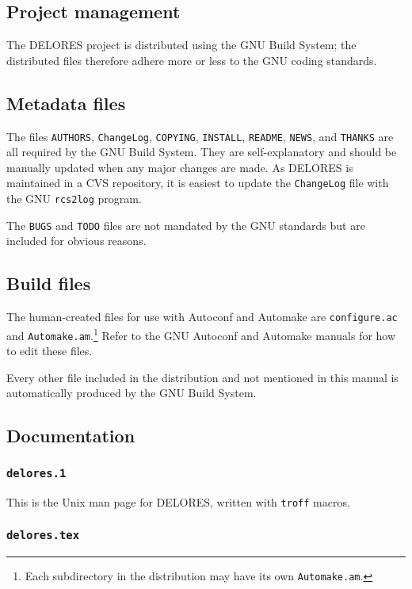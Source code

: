 \documentclass[a4paper,10pt,twocolumn]{article}
\begin{document}
\subsection{Project management}

The DELORES project is distributed using the GNU Build System; the
distributed files therefore adhere more or less to the GNU coding
standards.

\subsection{Metadata files}

The files \texttt{AUTHORS}, \texttt{ChangeLog}, \texttt{COPYING},
\texttt{INSTALL}, \texttt{README}, \texttt{NEWS}, and \texttt{THANKS}
are all required by the GNU Build System.  They are self-explanatory
and should be manually updated when any major changes are made.  As
DELORES is maintained in a CVS repository, it is easiest to update the
\texttt{ChangeLog} file with the GNU \texttt{rcs2log} program.

The \texttt{BUGS} and \texttt{TODO} files are not mandated by the GNU
standards but are included for obvious reasons.

\subsection{Build files}

The human-created files for use with Autoconf and Automake are
\texttt{configure.ac} and \texttt{Automake.am}.\footnote{Each
  subdirectory in the distribution may have its own
  \texttt{Automake.am}.}  Refer to the GNU Autoconf and Automake
manuals for how to edit these files.

Every other file included in the distribution and not mentioned in
this manual is automatically produced by the GNU Build System.

\subsection{Documentation}

\subsubsection{\texttt{delores.1}}

This is the Unix man page for DELORES, written with \texttt{troff}
macros.

\subsubsection{\texttt{delores.tex}}
\end{document}
